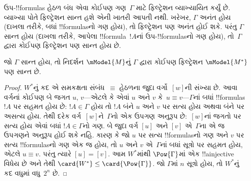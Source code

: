 \documentclass[../../../include/open-logic-section]{subfiles}
\begin{document}


ઉપ-!!{formula}s હેઠળ બંધ એવા કોઈપણ ગણ~$\Gamma$ માટે ફિલ્ટ્રેશન
વ્યાખ્યાયિત કર્યું છે. વ્યાખ્યા પોતે ફિલ્ટ્રેશન સાન્ત હશે એની ખાતરી
આપતી નથી. ખરેખર, $\Gamma$ અનંત હોય (દાખલા તરીકે, બધાં
!!{formula}sનો ગણ હોય), તો ફિલ્ટ્રેશન પણ અનંત હોઈ શકે. પરંતુ
$\Gamma$ સાન્ત હોય (દાખલા તરીકે, આપેલા !!{formula}~$!A$નાં
ઉપ-!!{formula}sનો ગણ હોય), તો~$\Gamma$ દ્વારા કોઈપણ ફિલ્ટ્રેશન
પણ સાન્ત હોય છે.

\begin{prop}
  જો $\Gamma$ સાન્ત હોય, તો નિદર્શન $\mModel{M}$નું $\Gamma$ દ્વારા
  કોઈપણ ફિલ્ટ્રેશન $\mModel{M^*}$ પણ સાન્ત છે.
\end{prop}

\begin{proof}
  $W^*$નું કદ એ સમકક્ષતા સંબંધ~$\equiv$ હેઠળના જુદા વર્ગો~$[w]$ની
  સંખ્યા છે. આવા વર્ગનાં કોઈપણ બે જગત $u$, $v$—એટલે કે એવાં
  $u$ અને $v$ કે~$u \equiv v$—$\Gamma$નાં બધાં
  !!{formula}s~$!A$ પર સહમત હોય છે: $!A \in \Gamma$ હોય તો $!A$
  બંને $u$ અને $v$ પર સત્ય હોય અથવા બંને પર અસત્ય હોય. તેથી દરેક
  વર્ગ~$[w]$ને~$\Gamma$નો એક ઉપગણ અનુરૂપ છે:~$[w]$નાં જગતો પર
  સત્ય હોય એવાં બધાં $!A \in \Gamma$નો ગણ. બે જુદા વર્ગ
  $[u]$ અને $[v]$ એ~$\Gamma$ના એ જ ઉપગણને અનુરૂપ હોઈ શકે નહિ. કારણ કે જો
  $u$ પર સત્ય !!{formula}sનો ગણ અને $v$ પર સત્ય !!{formula}sનો
  ગણ એક જ હોય, તો $u$ અને $v$ એ~$\Gamma$નાં બધાં સૂત્રો પર
  સહમત હોય, એટલે $u \equiv v$. પરંતુ ત્યારે $[u] = [v]$.
  આમ $W^*$માંથી $\Pow{\Gamma}$માં એક !!a{injective} વિધેય છે અને
  તેથી $\card{W^*} \le \card{\Pow{\Gamma}}$. જો $\Gamma$માં $n$
  સૂત્રો હોય, તો $W^*$નું કદ વધુમાં વધુ~$2^n$ છે.
\end{proof}
\end{document}
